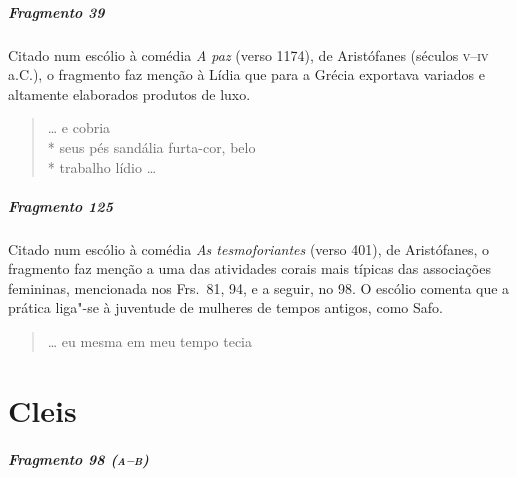 \paragraph{Fragmento 39}

{\small Citado num escólio à comédia \textit{A paz} (verso 1174), de Aristófanes (séculos \textsc{v}--\textsc{iv} a.C.),
o fragmento faz menção à Lídia que para a Grécia exportava variados e altamente
elaborados produtos de luxo.}

\begin{verse}
\ldots{} e cobria\\*
seus pés sandália furta-cor, belo\\*
trabalho lídio \ldots{}
\end{verse}

\paragraph{Fragmento 125}

{\small Citado num escólio à comédia \textit{As tesmoforiantes} (verso 401), de Aristófanes, o fragmento faz menção a uma das atividades corais mais típicas das associações femininas, mencionada nos Frs.~81, 94, e a seguir, no 98. O escólio comenta que a prática liga"-se à juventude de mulheres de tempos antigos, como Safo.}

\begin{verse}
\ldots{} eu mesma em meu tempo tecia 
\end{verse}


\chapter{Cleis}

\paragraph{Fragmento 98 (\textsc{a--b})}

